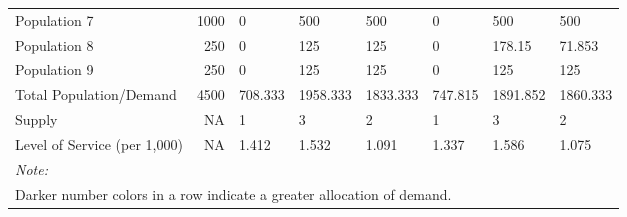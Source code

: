 \documentclass[10pt,letterpaper]{article}
\begin{document}
\begin{landscape}
\begin{table}[t]
\begin{tabular}{lrllllll}
Population 7 & 1000 & \textcolor[HTML]{FCCE25}{0} & \textcolor[HTML]{0D0887}{500} & \textcolor[HTML]{0D0887}{500} & \textcolor[HTML]{FCCE25}{0} & \textcolor[HTML]{0D0887}{500} & \textcolor[HTML]{0D0887}{500}\\
Population 8 & 250 & \textcolor[HTML]{FCCE25}{0} & \textcolor[HTML]{8505A7}{125} & \textcolor[HTML]{8505A7}{125} & \textcolor[HTML]{FCCE25}{0} & \textcolor[HTML]{0D0887}{178.15} & \textcolor[HTML]{D45270}{71.853}\\
Population 9 & 250 & \textcolor[HTML]{FCCE25}{0} & \textcolor[HTML]{0D0887}{125} & \textcolor[HTML]{0D0887}{125} & \textcolor[HTML]{FCCE25}{0} & \textcolor[HTML]{0D0887}{125} & \textcolor[HTML]{0D0887}{125}\\
Total Population/Demand & 4500 & 708.333 & 1958.333 & 1833.333 & 747.815 & 1891.852 & 1860.333\\
\addlinespace
Supply & NA & 1 & 3 & 2 & 1 & 3 & 2\\
Level of Service (per 1,000) & NA & 1.412 & 1.532 & 1.091 & 1.337 & 1.586 & 1.075\\
\bottomrule
\multicolumn{8}{l}{\textit{Note: }}\\
\multicolumn{8}{l}{Darker number colors in a row indicate a greater allocation of demand. }\\
\end{tabular}
\end{table}
\end{landscape}
\end{document}
